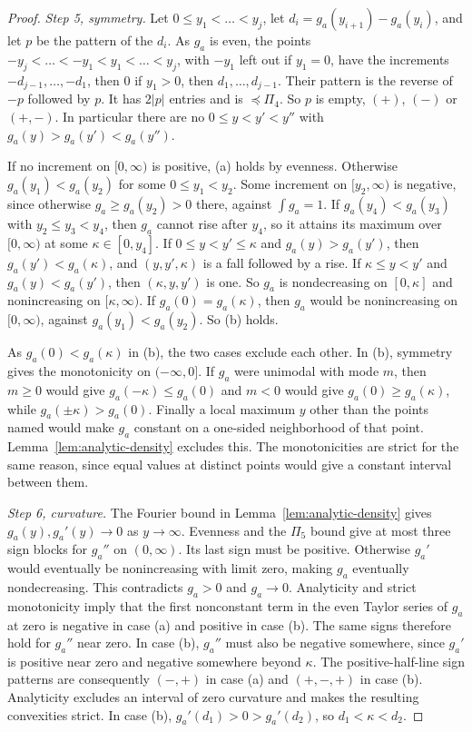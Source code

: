 \begin{proof}
\emph{Step 5, symmetry.} Let $0\le y_1<\dots<y_j$, let
$d_i=g_a(y_{i+1})-g_a(y_i)$, and let $p$ be the pattern of the $d_i$. As $g_a$
is even, the points $-y_j<\dots<-y_1<y_1<\dots<y_j$, with $-y_1$ left out if
$y_1=0$, have the increments $-d_{j-1},\dots,-d_1$, then $0$ if $y_1>0$, then
$d_1,\dots,d_{j-1}$. Their pattern is the reverse of $-p$ followed by $p$. It
has $2\lvert p\rvert$ entries and is $\preceq\Pi_4$. So $p$ is empty, $(+)$,
$(-)$ or $(+,-)$. In particular there are no $0\le y<y'<y''$ with
$g_a(y)>g_a(y')<g_a(y'')$.

If no increment on $[0,\infty)$ is positive, (a) holds by evenness. Otherwise
$g_a(y_1)<g_a(y_2)$ for some $0\le y_1<y_2$. Some increment on
$[y_2,\infty)$ is negative, since otherwise $g_a\ge g_a(y_2)>0$ there, against
$\int g_a=1$. If $g_a(y_4)<g_a(y_3)$ with $y_2\le y_3<y_4$, then $g_a$ cannot rise
after $y_4$, so it attains its maximum over $[0,\infty)$ at some
$\kappa\in[0,y_4]$. If $0\le y<y'\le \kappa$ and $g_a(y)>g_a(y')$, then $g_a(y')<g_a(\kappa)$,
and $(y,y',\kappa)$ is a fall followed by a rise. If $\kappa\le y<y'$ and
$g_a(y)<g_a(y')$, then $(\kappa,y,y')$ is one. So $g_a$ is nondecreasing on $[0,\kappa]$
and nonincreasing on $[\kappa,\infty)$. If $g_a(0)=g_a(\kappa)$, then $g_a$ would be
nonincreasing on $[0,\infty)$, against $g_a(y_1)<g_a(y_2)$. So (b) holds.

As $g_a(0)<g_a(\kappa)$ in (b), the two cases exclude each other. In (b),
symmetry gives the monotonicity on $(-\infty,0]$. If $g_a$ were unimodal with
mode $m$, then $m\ge0$ would give $g_a(-\kappa)\le g_a(0)$ and $m<0$ would give
$g_a(0)\ge g_a(\kappa)$, while $g_a(\pm \kappa)>g_a(0)$. Finally a local maximum $y$ other
than the points named would make $g_a$ constant on a one-sided
neighborhood of that point. Lemma~\ref{lem:analytic-density} excludes this.
The monotonicities are strict for the same reason, since equal values
at distinct points would give a constant interval between them.

\emph{Step 6, curvature.} The Fourier bound in
Lemma~\ref{lem:analytic-density} gives $g_a(y),g_a'(y)\to0$ as
$y\to\infty$. Evenness and the $\Pi_5$ bound give at most three sign
blocks for $g_a''$ on $(0,\infty)$. Its last sign must be positive. Otherwise $g_a'$ would eventually
be nonincreasing with limit zero, making $g_a$ eventually nondecreasing.
This contradicts $g_a>0$ and $g_a\to0$.
Analyticity and strict monotonicity imply that the first nonconstant
term in the even Taylor series of $g_a$ at zero is negative in case (a)
and positive in case (b). The same signs therefore hold for $g_a''$
near zero. In case (b), $g_a''$ must also be negative somewhere, since
$g_a'$ is positive near zero and negative somewhere beyond $\kappa$.
The positive-half-line sign patterns are consequently $(-,+)$ in
case (a) and $(+,-,+)$ in case (b). Analyticity excludes an interval
of zero curvature and makes the resulting convexities strict. In
case (b), $g_a'(d_1)>0>g_a'(d_2)$, so $d_1<\kappa<d_2$.
\end{proof}

